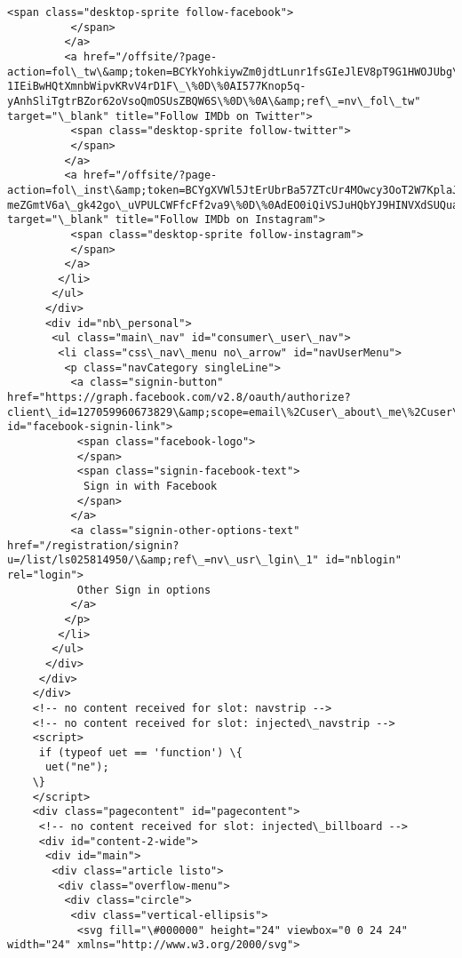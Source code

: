 \documentclass[11pt]{article}
\begin{document}
\begin{Verbatim}[commandchars=\\\{\}]
          <span class="desktop-sprite follow-facebook">
          </span>
         </a>
         <a href="/offsite/?page-action=fol\_tw\&amp;token=BCYkYohkiywZm0jdtLunr1fsGIeJlEV8pT9G1HWOJUbg\_jX2OLt5\_14VKxHdsGCVfhCri18L9npZ\%0D\%0AwEHxVRATxaoYZqOwPiTIw06apexd7ypfMoKO74imPR2\_tvij-1IEiBwHQtXmnbWipvKRvV4rD1F\_\%0D\%0AI577Knop5q-yAnhSliTgtrBZor62oVsoQmOSUsZBQW6S\%0D\%0A\&amp;ref\_=nv\_fol\_tw" target="\_blank" title="Follow IMDb on Twitter">
          <span class="desktop-sprite follow-twitter">
          </span>
         </a>
         <a href="/offsite/?page-action=fol\_inst\&amp;token=BCYgXVWl5JtErUbrBa57ZTcUr4MOwcy3OoT2W7KplaJV\_tV0ckVsW\_kQJKWDhomT5lA0IP0x9pxy\%0D\%0AKSWDEAgtCBk2kGPlVZ30wFQhJQVbB1WcYBSVmNhjjZ-meZGmtV6a\_gk42go\_uVPULCWFfcFf2va9\%0D\%0AdEO0iQiVSJuHQbYJ9HINVXdSUQua11lAI1k9Xfl6ijF6\%0D\%0A\&amp;ref\_=nv\_fol\_inst" target="\_blank" title="Follow IMDb on Instagram">
          <span class="desktop-sprite follow-instagram">
          </span>
         </a>
        </li>
       </ul>
      </div>
      <div id="nb\_personal">
       <ul class="main\_nav" id="consumer\_user\_nav">
        <li class="css\_nav\_menu no\_arrow" id="navUserMenu">
         <p class="navCategory singleLine">
          <a class="signin-button" href="https://graph.facebook.com/v2.8/oauth/authorize?client\_id=127059960673829\&amp;scope=email\%2Cuser\_about\_me\%2Cuser\_birthday\&amp;state=eyI0OWU2YyI6ImRhMjkiLCJ1IjoiaHR0cHM6Ly93d3cuaW1kYi5jb20vP3JlZl89bnZfZmJfbGdpbiIsIm1hbnVhbExpbmsiOiJmYWxzZSJ9\&amp;redirect\_uri=https\%3A\%2F\%2Fwww.imdb.com\%2Fregistration\%2Ffacebookhandler\%2F" id="facebook-signin-link">
           <span class="facebook-logo">
           </span>
           <span class="signin-facebook-text">
            Sign in with Facebook
           </span>
          </a>
          <a class="signin-other-options-text" href="/registration/signin?u=/list/ls025814950/\&amp;ref\_=nv\_usr\_lgin\_1" id="nblogin" rel="login">
           Other Sign in options
          </a>
         </p>
        </li>
       </ul>
      </div>
     </div>
    </div>
    <!-- no content received for slot: navstrip -->
    <!-- no content received for slot: injected\_navstrip -->
    <script>
     if (typeof uet == 'function') \{
      uet("ne");
    \}
    </script>
    <div class="pagecontent" id="pagecontent">
     <!-- no content received for slot: injected\_billboard -->
     <div id="content-2-wide">
      <div id="main">
       <div class="article listo">
        <div class="overflow-menu">
         <div class="circle">
          <div class="vertical-ellipsis">
           <svg fill="\#000000" height="24" viewbox="0 0 24 24" width="24" xmlns="http://www.w3.org/2000/svg">

\end{Verbatim}
\end{document}
